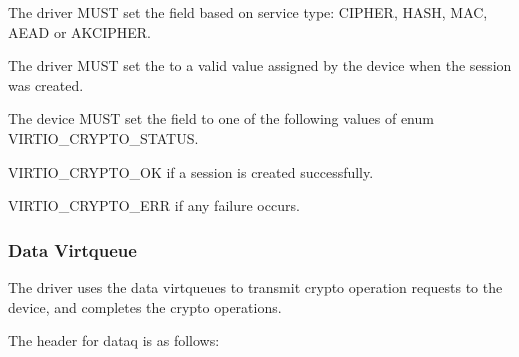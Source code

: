 
\begin{itemize*}
\item The driver MUST set the  field based on service type: CIPHER, HASH, MAC, AEAD or AKCIPHER.
\item The driver MUST set the  to a valid value assigned by the device
    when the session was created.
\end{itemize*}


\begin{itemize*}
\item The device MUST set the  field to one of the following values of enum VIRTIO_CRYPTO_STATUS.
\begin{itemize*}
\item VIRTIO_CRYPTO_OK if a session is created successfully.
\item VIRTIO_CRYPTO_ERR if any failure occurs.
\end{itemize*}
\end{itemize*}


\subsubsection{Data Virtqueue}\label{sec:Device Types / Crypto Device / Device Operation / Data Virtqueue}

The driver uses the data virtqueues to transmit crypto operation requests to the device,
and completes the crypto operations.

The header for dataq is as follows:


